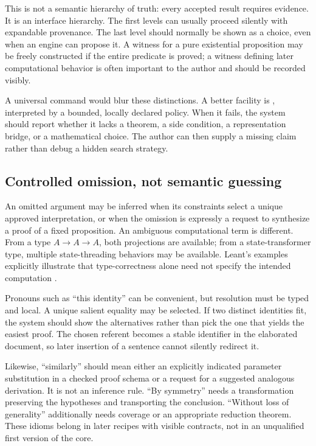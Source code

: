 \documentclass[11pt,letterpaper]{article}
\newcommand{\code}[1]{\texttt{\detokenize{#1}}}
\theoremstyle{remark}
\begin{document}
This is not a semantic hierarchy of truth: every accepted result requires evidence. It is an interface hierarchy. The first levels can usually proceed silently with expandable provenance. The last level should normally be shown as a choice, even when an engine can propose it. A witness for a pure existential proposition may be freely constructed if the entire predicate is proved; a witness defining later computational behavior is often important to the author and should be recorded visibly.

A universal command \code{obvious} would blur these distinctions. A better facility is \code{by routine}, interpreted by a bounded, locally declared policy. When it fails, the system should report whether it lacks a theorem, a side condition, a representation bridge, or a mathematical choice. The author can then supply a missing claim rather than debug a hidden search strategy.

\subsection{Controlled omission, not semantic guessing}

An omitted argument may be inferred when its constraints select a unique approved interpretation, or when the omission is expressly a request to synthesize a proof of a fixed proposition. An ambiguous computational term is different. From a type $A\to A\to A$, both projections are available; from a state-transformer type, multiple state-threading behaviors may be available. Leant's examples explicitly illustrate that type-correctness alone need not specify the intended computation \cite{leant-readme}.

Pronouns such as ``this identity'' can be convenient, but resolution must be typed and local. A unique salient equality may be selected. If two distinct identities fit, the system should show the alternatives rather than pick the one that yields the easiest proof. The chosen referent becomes a stable identifier in the elaborated document, so later insertion of a sentence cannot silently redirect it.

Likewise, ``similarly'' should mean either an explicitly indicated parameter substitution in a checked proof schema or a request for a suggested analogous derivation. It is not an inference rule. ``By symmetry'' needs a transformation preserving the hypotheses and transporting the conclusion. ``Without loss of generality'' additionally needs coverage or an appropriate reduction theorem. These idioms belong in later recipes with visible contracts, not in an unqualified first version of the core.
\end{document}
